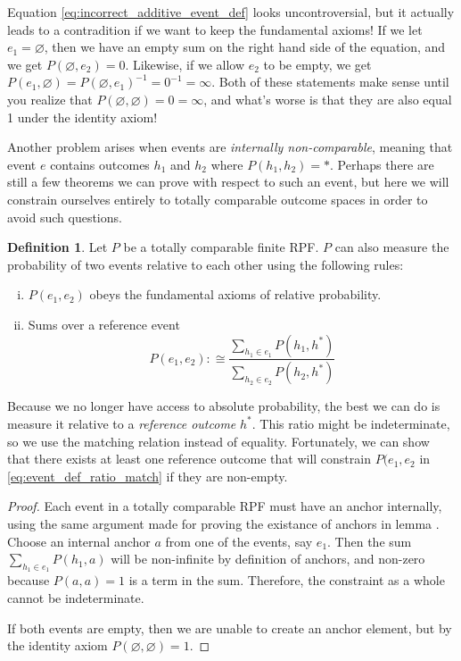 \documentclass[twoside]{article}
\theoremstyle{plain}%
\theoremstyle{definition}
\newtheorem{definition}{Definition}[section]
\theoremstyle{remark}
\begin{document}
Equation \ref{eq:incorrect_additive_event_def} looks uncontroversial, but it actually leads to a contradition if we want to keep the fundamental axioms! If we let \(e_1 = \varnothing\), then we have an empty sum on the right hand side of the equation, and we get \(P(\varnothing, e_2) = 0\). Likewise, if we allow \(e_2\) to be empty, we get \(P(e_1, \varnothing) = P(\varnothing, e_1)^{-1}=0^{-1}=\infty\). Both of these statements make sense until you realize that \(P(\varnothing, \varnothing) = 0 = \infty\), and what's worse is that they are also equal 1 under the identity axiom!

Another problem arises when events are \textit{internally non-comparable}, meaning that event \(e\) contains outcomes \(h_1\) and \(h_2\) where \(P(h_1, h_2) = \ast\). Perhaps there are still a few theorems we can prove with respect to such an event, but here we will constrain ourselves entirely to totally comparable outcome spaces in order to avoid such questions.

\begin{definition}
Let \(P\) be a totally comparable finite RPF. \(P\) can also measure the probability of two events relative to each other using the following rules:

\begin{enumerate}[(i)]
  \item \label{event_def_1} \(P(e_1, e_2)\) obeys the fundamental axioms of relative probability.
  \item \label{event_def_2} Sums over a reference event
    \begin{equation}
      \label{eq:event_def_ratio_match}
      P(e_1, e_2) :\cong \frac{\sum_{h_1 \in e_1} P(h_1, h^*)}{\sum_{h_2 \in e_2} P(h_2, h^*)}
    \end{equation}
\end{enumerate}
\end{definition}

Because we no longer have access to absolute probability, the best we can do is measure it relative to a \textit{reference outcome} \(h^*\). This ratio might be indeterminate, so we use the matching relation instead of equality. Fortunately, we can show that there exists at least one reference outcome that will constrain \(P(e_1, e_2\) in \ref{eq:event_def_ratio_match} if they are non-empty.

\begin{proof}
Each event in a totally comparable RPF must have an anchor internally, using the same argument made for proving the existance of anchors in lemma \label{lemma:totally_comp_anchored}. Choose an internal anchor \(a\) from one of the events, say \(e_1\). Then the sum \(\sum_{h_1 \in e_1} P(h_1, a)\) will be non-infinite by definition of anchors, and non-zero because \(P(a, a) = 1\) is a term in the sum. Therefore, the constraint as a whole cannot be indeterminate.

If both events are empty, then we are unable to create an anchor element, but by the identity axiom \(P(\varnothing, \varnothing) = 1\).
\end{proof}
\end{document}
